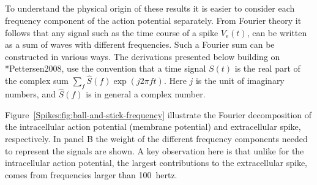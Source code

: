%

\subsection{}
\label{Spikes:sec:Fourier}

To understand the physical origin of these results it is easier to consider each frequency 
component of the action potential separately. From Fourier theory it follows that any signal
such as the time course of a spike $V_\mathrm{e}(t)$, can be written as a sum of waves with different frequencies.
Such a Fourier sum can be constructed in various ways. The derivations presented below 
building on \citeasnoun**{Pettersen2008}, use the convention that a time signal $S(t)$ is the real part of the complex 
sum $\sum_{f}  \hat{S}(f) \exp (j 2 \pi f t)$. Here $j$ is the unit of imaginary numbers, and  $\hat{S}(f)$ is in general a 
complex number. 

Figure~\ref{Spikes:fig:ball-and-stick-frequency} illustrate the Fourier decomposition of the
intracellular action potential (membrane potential) and extracellular spike, respectively.
In panel B the weight of the different frequency components needed to represent the signals are shown.
A key observation here is that unlike for the intracellular action potential, the largest
contributions to the extracellular spike, comes from frequencies larger than 100~hertz.



